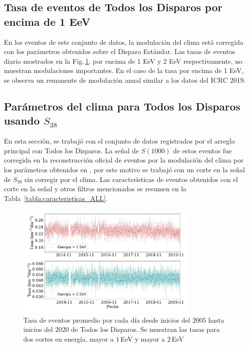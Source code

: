 \subsection{Tasa de eventos de Todos los Disparos por encima de 1 EeV}

En  los eventos de este conjunto de datos, la modulación del clima está corregida con los parámetros obtenidos sobre el Disparo Estándar. Las tasas de eventos diario mostrados en la Fig.\,\ref{fig:rate_ALL}, por encima de 1 EeV y 2 EeV respectivamente, no muestran modulaciones importantes. En el caso de la tasa por encima de 1 EeV, se observa un remanente de modulación anual similar a los datos del ICRC 2019. 





\subsection{Parámetros del clima para Todos los Disparos usando $S_{38}$}


En esta sección, se trabajó con el conjunto de datos registrados por el arreglo principal con Todos los Disparos. La señal de $S(1000)$ de estos eventos fue corregida en la reconstrucción oficial de eventos por la modulación del clima por los parámetros obtenidos en \cite{aab2017impact}, por este motivo se trabajó con un corte en la señal de $S_{38}$ sin corregir por el clima. Las características de eventos obtenidos con el corte en la señal y otros filtros mencionados se resumen en la Tabla~\ref{tabla:caracteristicas_ALL}. 

\begin{figure}[H]
  \centering
  \includegraphics[width=0.8\textwidth]{../04_Clima/Graphs/rate_dayly/AllTriggers_1EeV_2EeV_rate.pdf}
  \caption{Tasa de eventos promedio por cada día desde inicios del 2005 hasta inicios del 2020 de Todos los Disparos. Se muestran las tasas para dos cortes en energía, mayor a $1\,$EeV y mayor a $2\,$EeV}\label{fig:rate_ALL}
\end{figure}

